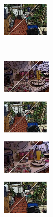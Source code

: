 \begin{figure}
\begin{subfigure}[b]{0.1375\textwidth}
	\end{subfigure}
	\begin{subfigure}[b]{0.129\textwidth}
		\includegraphics[height=1.65cm]{pictures/sunrgbd/vc/cropped/vc_00004732_contours}
	\end{subfigure}\\
	\begin{subfigure}[b]{0.02\textwidth}
	\end{subfigure}
	\begin{subfigure}[b]{0.1375\textwidth}
		\includegraphics[height=1.65cm]{pictures/nyuv2/ccs/cropped/ccs_00000561_contours}
	\end{subfigure}
	\begin{subfigure}[b]{0.129\textwidth}
		\includegraphics[height=1.65cm]{pictures/sunrgbd/ccs/cropped/ccs_00004732_contours}
	\end{subfigure}
	\begin{subfigure}[b]{0.02\textwidth}
	\end{subfigure}
	\begin{subfigure}[b]{0.1375\textwidth}
		\includegraphics[height=1.65cm]{pictures/nyuv2/vccs/cropped/vccs_00000561_contours}
	\end{subfigure}
	\begin{subfigure}[b]{0.129\textwidth}
		\includegraphics[height=1.65cm]{pictures/sunrgbd/vccs/cropped/vccs_00004732_contours}

\end{subfigure}
\end{figure}
